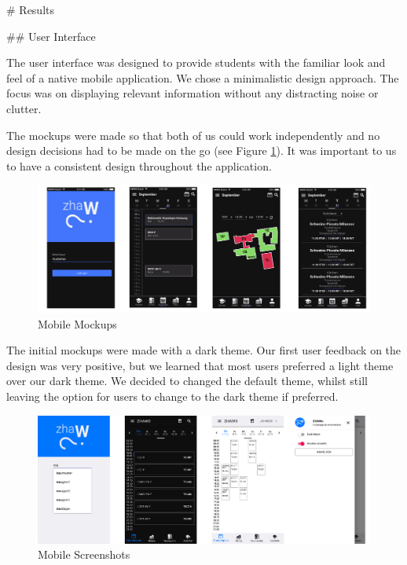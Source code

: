 \begin{markdown}

# Results

## User Interface

The user interface was designed to provide students with the familiar look and feel of a native mobile application. We chose a minimalistic design approach. The focus was on displaying relevant information without any distracting noise or clutter.

The mockups were made so that both of us could work independently and no design decisions had to be made on the go (see Figure \ref{fig:MobileMockups}). It was important to us to have a consistent design throughout the application.

\begin{figure}[H]
  \includegraphics[width=17.75cm, center]{../../Mockups/Mobile_Mockups.png}
  \caption{\textsf{Mobile Mockups}}
  \label{fig:MobileMockups}
\end{figure}

The initial mockups were made with a dark theme. Our first user feedback on the design was very positive, but we learned that most users preferred a light theme over our dark theme. We decided to changed the default theme, whilst still leaving the option for users to change to the dark theme if preferred.

\bigskip

\begin{figure}[H]
  \includegraphics[width=16.5cm, center]{../../Mockups/screenshots.png}
  \caption{\textsf{Mobile Screenshots}}
\end{figure} 

\end{markdown}

